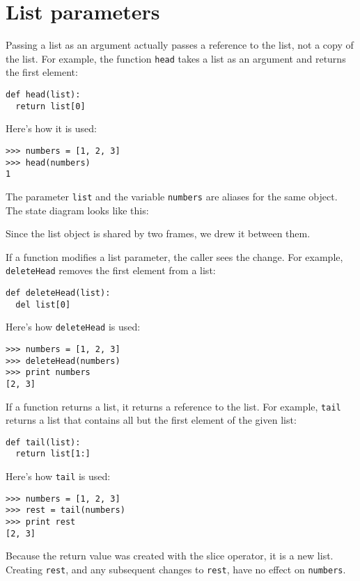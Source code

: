 \section{List parameters}

Passing a list as an argument actually passes a reference to the
list, not a copy of the list.
For example, the function {\tt head} takes a list as an argument
and returns the first element:

\beforeverb
\begin{verbatim}
def head(list):
  return list[0]
\end{verbatim}
\afterverb
%
Here's how it is used:

\beforeverb
\begin{verbatim}
>>> numbers = [1, 2, 3]
>>> head(numbers)
1
\end{verbatim}
\afterverb
%
The parameter {\tt list} and the variable {\tt numbers} are
aliases for the same object.  The state diagram looks like
this:

\beforefig
\centerline{}
\afterfig

Since the list object is shared by two frames, we drew
it between them.

If a function modifies a list parameter, the caller sees the change.
For example, {\tt deleteHead} removes the first element from a list:

\beforeverb
\begin{verbatim}
def deleteHead(list):
  del list[0]
\end{verbatim}
\afterverb
%
Here's how {\tt deleteHead} is used:

\beforeverb
\begin{verbatim}
>>> numbers = [1, 2, 3]
>>> deleteHead(numbers)
>>> print numbers
[2, 3]
\end{verbatim}
\afterverb
%
If a function returns a list, it returns a reference to the list.  For
example, {\tt tail} returns a list that contains all but the first
element of the given list:

\beforeverb
\begin{verbatim}
def tail(list):
  return list[1:]
\end{verbatim}
\afterverb
%
Here's how {\tt tail} is used:

\beforeverb
\begin{verbatim}
>>> numbers = [1, 2, 3]
>>> rest = tail(numbers)
>>> print rest
[2, 3]
\end{verbatim}
\afterverb
%
Because the return value was created with the slice operator, it
is a new list.  Creating {\tt rest}, and any subsequent changes
to {\tt rest}, have no effect on {\tt numbers}.



